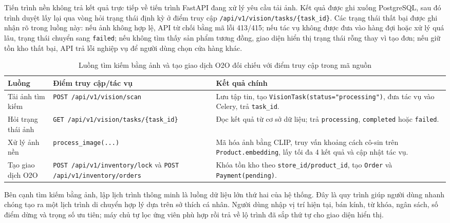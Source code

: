 \documentclass[12pt, a4paper]{article}
\begin{document}
Tiến trình nền không trả kết quả trực tiếp về tiến trình FastAPI đang xử lý yêu cầu tải ảnh. Kết quả được ghi xuống PostgreSQL, sau đó trình duyệt lấy lại qua vòng hỏi trạng thái định kỳ ở điểm truy cập \texttt{/api/v1/vision/tasks/\{task\_id\}}. Các trạng thái thất bại được ghi nhận rõ trong luồng này: nếu ảnh không hợp lệ, API từ chối bằng mã lỗi 413/415; nếu tác vụ không được đưa vào hàng đợi hoặc xử lý quá lâu, trạng thái chuyển sang \texttt{failed}; nếu không tìm thấy sản phẩm tương đồng, giao diện hiển thị trạng thái rỗng thay vì tạo đơn; nếu giữ tồn kho thất bại, API trả lỗi nghiệp vụ để người dùng chọn cửa hàng khác.

\begin{table}[H]
\centering
\renewcommand{\arraystretch}{1.25}
\small
\begin{adjustbox}{max width=\textwidth}
\begin{tabular}{|>{\raggedright\arraybackslash}p{2.4cm}|>{\raggedright\arraybackslash}p{5.5cm}|>{\raggedright\arraybackslash}p{6.8cm}|}
\hline
\textbf{Luồng} & \textbf{Điểm truy cập/tác vụ} & \textbf{Kết quả chính} \\ \hline
Tải ảnh tìm kiếm & \texttt{POST /api/v1/\allowbreak vision/\allowbreak scan} & Lưu tập tin, tạo \texttt{VisionTask(status="processing")}, đưa tác vụ vào Celery, trả \texttt{task\_id}. \\ \hline
Hỏi trạng thái ảnh & \texttt{GET /api/v1/\allowbreak vision/\allowbreak tasks/\allowbreak \{task\_id\}} & Đọc kết quả từ cơ sở dữ liệu; trả \texttt{processing}, \texttt{completed} hoặc \texttt{failed}. \\ \hline
Xử lý ảnh nền & \texttt{process\_image(...)} & Mã hóa ảnh bằng CLIP, truy vấn khoảng cách cô-sin trên \texttt{Product.embedding}, lấy tối đa 4 kết quả và cập nhật tác vụ. \\ \hline
Tạo giao dịch O2O & \texttt{POST /api/v1/\allowbreak inventory/\allowbreak lock} và \texttt{POST /api/v1/\allowbreak inventory/\allowbreak orders} & Khóa tồn kho theo \texttt{store\_id/\allowbreak product\_id}, tạo \texttt{Order} và \texttt{Payment(pending)}. \\ \hline
\end{tabular}
\end{adjustbox}
\caption{Luồng tìm kiếm bằng ảnh và tạo giao dịch O2O đối chiếu với điểm truy cập trong mã nguồn}
\label{tab:vision_o2o_flow}
\end{table}

Bên cạnh tìm kiếm bằng ảnh, lập lịch trình thông minh là luồng dữ liệu lớn thứ hai của hệ thống. Đây là quy trình giúp người dùng nhanh chóng tạo ra một lịch trình di chuyển hợp lý dựa trên sở thích cá nhân. Người dùng nhập vị trí hiện tại, bán kính, từ khóa, ngân sách, số điểm dừng và trọng số ưu tiên; máy chủ tự lọc ứng viên phù hợp rồi trả về lộ trình đã sắp thứ tự cho giao diện hiển thị.
\end{document}
